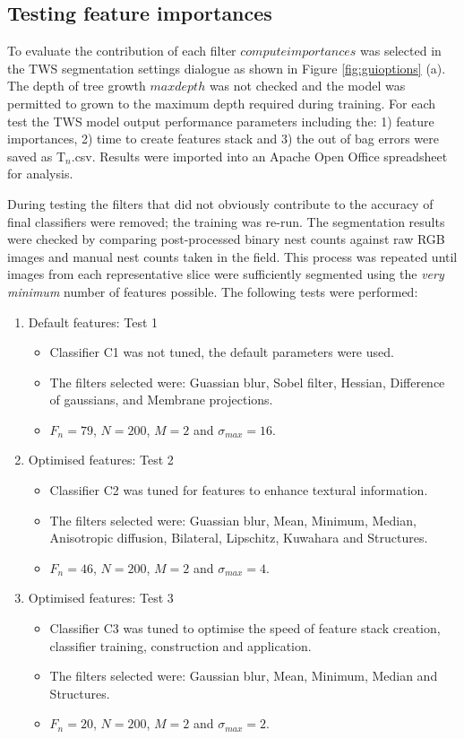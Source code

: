 \subsection{Testing feature importances}\label{sec:testing-feature-importances}

To evaluate the contribution of each filter $computeimportances$ was selected in the \ac{TWS} segmentation settings dialogue as shown in Figure \ref{fig:guioptions} (a).
The depth of tree growth $maxdepth$ was not checked and the model was permitted to grown to the maximum depth required during training. For each test the \ac{TWS} model output performance parameters including the: 1) feature importances, 2) time to create features stack and 3) the out of bag errors were saved as T$_{n}$.csv. Results were imported into an Apache Open Office spreadsheet for analysis.

During testing the filters that did not obviously contribute to the accuracy of final classifiers were removed; the training was re-run. The segmentation results were checked by comparing post-processed binary nest counts against raw \ac{RGB} images and manual nest counts taken in the field. This process was repeated until images from each representative slice were sufficiently segmented using the \emph{very minimum} number of features possible. The following tests were performed: 

\begin{enumerate}
\item Default features: Test 1
	\begin{itemize}
	\item Classifier C1 was not tuned, the default parameters were used.
	\item The filters selected were: Guassian blur, Sobel filter, Hessian, Difference of gaussians, and Membrane projections. 
	\item $F_n = 79$,  $N = 200$, $M = 2$ and $\sigma_{max} = 16$.
	\end{itemize}
\item Optimised features: Test 2
	\begin{itemize}
	\item Classifier C2 was tuned for features to enhance textural information. 
	\item The filters selected were: Guassian blur, Mean, Minimum, Median, Anisotropic diffusion, Bilateral, Lipschitz, Kuwahara and Structures. 
	\item $F_n = 46$, $N = 200$, $M = 2$ and $\sigma_{max} = 4$. 
	\end{itemize}
\item Optimised features: Test 3
	\begin{itemize}
	\item Classifier C3 was tuned to optimise the speed of feature stack creation, classifier training, construction and application. 
	\item The filters selected were: Gaussian blur, Mean, Minimum, Median and Structures. 
	\item $F_n = 20$, $N = 200$, $M = 2$ and $\sigma_{max} = 2$. 
	\end{itemize}
\end{enumerate}

